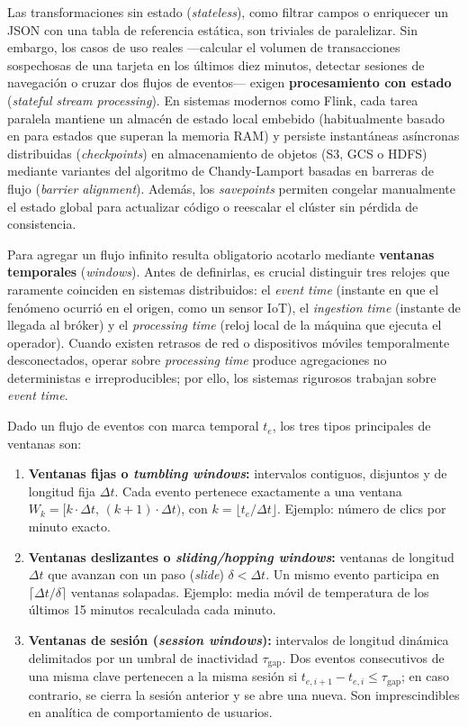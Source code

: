 Las transformaciones sin estado (\textit{stateless}), como filtrar campos o enriquecer un JSON con una tabla de referencia estática, son triviales de paralelizar. Sin embargo, los casos de uso reales ---calcular el volumen de transacciones sospechosas de una tarjeta en los últimos diez minutos, detectar sesiones de navegación o cruzar dos flujos de eventos--- exigen \textbf{procesamiento con estado} (\textit{stateful stream processing}). En sistemas modernos como Flink, cada tarea paralela mantiene un almacén de estado local embebido (habitualmente basado en  para estados que superan la memoria RAM) y persiste instantáneas asíncronas distribuidas (\textit{checkpoints}) en almacenamiento de objetos (S3, GCS o HDFS) mediante variantes del algoritmo de Chandy-Lamport basadas en barreras de flujo (\textit{barrier alignment}). Además, los \textit{savepoints} permiten congelar manualmente el estado global para actualizar código o reescalar el clúster sin pérdida de consistencia.

Para agregar un flujo infinito resulta obligatorio acotarlo mediante \textbf{ventanas temporales} (\textit{windows}). Antes de definirlas, es crucial distinguir tres relojes que raramente coinciden en sistemas distribuidos: el \textit{event time} (instante en que el fenómeno ocurrió en el origen, como un sensor IoT), el \textit{ingestion time} (instante de llegada al bróker) y el \textit{processing time} (reloj local de la máquina que ejecuta el operador). Cuando existen retrasos de red o dispositivos móviles temporalmente desconectados, operar sobre \textit{processing time} produce agregaciones no deterministas e irreproducibles; por ello, los sistemas rigurosos trabajan sobre \textit{event time}.

Dado un flujo de eventos con marca temporal $t_e$, los tres tipos principales de ventanas son:
\begin{enumerate}
  \item \textbf{Ventanas fijas o \textit{tumbling windows}:} intervalos contiguos, disjuntos y de longitud fija $\Delta t$. Cada evento pertenece exactamente a una ventana $W_k = [k\cdot\Delta t,\, (k+1)\cdot\Delta t)$, con $k = \lfloor t_e / \Delta t \rfloor$. Ejemplo: número de clics por minuto exacto.
  \item \textbf{Ventanas deslizantes o \textit{sliding/hopping windows}:} ventanas de longitud $\Delta t$ que avanzan con un paso (\textit{slide}) $\delta < \Delta t$. Un mismo evento participa en $\lceil \Delta t / \delta \rceil$ ventanas solapadas. Ejemplo: media móvil de temperatura de los últimos 15 minutos recalculada cada minuto.
  \item \textbf{Ventanas de sesión (\textit{session windows}):} intervalos de longitud dinámica delimitados por un umbral de inactividad $\tau_{\text{gap}}$. Dos eventos consecutivos de una misma clave pertenecen a la misma sesión si $t_{e,i+1} - t_{e,i} \le \tau_{\text{gap}}$; en caso contrario, se cierra la sesión anterior y se abre una nueva. Son imprescindibles en analítica de comportamiento de usuarios.
\end{enumerate}

